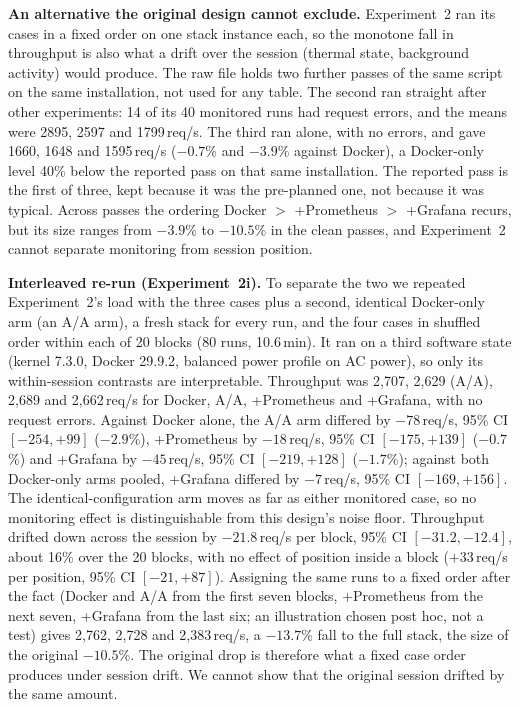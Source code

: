 \documentclass[conference]{IEEEtran}
\begin{document}
\textbf{An alternative the original design cannot exclude.} Experiment~2 ran its cases in
a fixed order on one stack instance each, so the monotone fall in throughput is
also what a drift over the session (thermal state, background activity) would
produce. The raw file holds two further passes of the same script on the same
installation, not used for any table. The second ran straight after other
experiments: 14 of its 40 monitored runs had request errors, and the means were
2895, 2597 and 1799\,req/s. The third ran alone, with no errors, and gave 1660,
1648 and 1595\,req/s ($-0.7$\% and $-3.9$\% against Docker), a Docker-only level
40\% below the reported pass on that same installation. The reported pass is the
first of three, kept because it was the pre-planned one, not because it was
typical. Across passes the ordering Docker $>$ +Prometheus $>$ +Grafana
recurs, but its size ranges from $-3.9$\% to $-10.5\%$ in the clean passes, and
Experiment~2 cannot separate monitoring from session position.

\textbf{Interleaved re-run (Experiment~2i).} To separate the two we repeated
Experiment~2's load with the three cases plus a second, identical Docker-only arm
(an A/A arm), a fresh stack for every run, and the four cases in shuffled order within
each of 20 blocks (80 runs, 10.6\,min). It ran on a third software state (kernel 7.3.0,
Docker 29.9.2, balanced power profile on AC power), so only its within-session contrasts
are interpretable. Throughput was 2{,}707, 2{,}629 (A/A), 2{,}689 and 2{,}662\,req/s for
Docker, A/A, +Prometheus and +Grafana, with no request errors. Against Docker alone, the
A/A arm differed by $-78$\,req/s, 95\% CI $[-254, +99]$ ($-2.9$\%), +Prometheus by
$-18$\,req/s, 95\% CI $[-175, +139]$ ($-0.7$\%) and +Grafana by $-45$\,req/s, 95\% CI
$[-219, +128]$ ($-1.7$\%); against both Docker-only arms pooled, +Grafana differed by
$-7$\,req/s, 95\% CI $[-169, +156]$. The identical-configuration arm moves as far as either
monitored case, so no monitoring effect is distinguishable from this design's noise floor.
Throughput drifted down across the session by $-21.8$\,req/s per block, 95\% CI
$[-31.2, -12.4]$, about 16\% over the 20 blocks, with no effect of position inside a block
($+33$\,req/s per position, 95\% CI $[-21, +87]$). Assigning the same runs to a fixed order
after the fact (Docker and A/A from the first seven blocks, +Prometheus from the next
seven, +Grafana from the last six; an illustration chosen post hoc, not a test) gives
2{,}762, 2{,}728 and 2{,}383\,req/s, a $-13.7$\% fall to the full stack, the size of the
original $-10.5$\%. The original drop is therefore what a fixed case order produces under
session drift. We cannot show that the original session drifted by the same amount.
\end{document}
